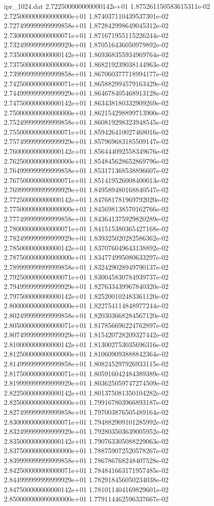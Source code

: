 \begin{filecontents}{ipr_1024.dat}
2.722500000000000142e+01 1.875261150583615311e-02
2.725000000000000000e+01 1.874037110439537301e-02
2.727499999999999858e+01 1.872842998649045312e-02
2.730000000000000071e+01 1.871671955115226244e-02
2.732499999999999929e+01 1.870516436050979892e-02
2.735000000000000142e+01 1.869368355934969764e-02
2.737500000000000000e+01 1.868219239038144963e-02
2.739999999999999858e+01 1.867060377718994177e-02
2.742500000000000071e+01 1.865882994579163429e-02
2.744999999999999929e+01 1.864678405468913128e-02
2.747500000000000142e+01 1.863438180332909269e-02
2.750000000000000000e+01 1.862154298899713900e-02
2.752499999999999858e+01 1.860819298323948545e-02
2.755000000000000071e+01 1.859426410027468016e-02
2.757499999999999929e+01 1.857969683185509147e-02
2.760000000000000142e+01 1.856444092558349676e-02
2.762500000000000000e+01 1.854845628652869796e-02
2.764999999999999858e+01 1.853171368538896607e-02
2.767500000000000071e+01 1.851419526008400013e-02
2.769999999999999929e+01 1.849589480168840547e-02
2.772500000000000142e+01 1.847681781969792020e-02
2.775000000000000000e+01 1.845698138570162766e-02
2.777499999999999858e+01 1.843641375929820289e-02
2.780000000000000071e+01 1.841515380365427168e-02
2.782499999999999929e+01 1.839325020282586362e-02
2.785000000000000142e+01 1.837076049643138892e-02
2.787500000000000000e+01 1.834774995080633297e-02
2.789999999999999858e+01 1.832429028949790137e-02
2.792500000000000071e+01 1.830045830784939737e-02
2.794999999999999929e+01 1.827633439967840320e-02
2.797500000000000142e+01 1.825200102483361120e-02
2.800000000000000000e+01 1.822754114848977244e-02
2.802499999999999858e+01 1.820303668284567120e-02
2.805000000000000071e+01 1.817856696224762897e-02
2.807499999999999929e+01 1.815420728209327442e-02
2.810000000000000142e+01 1.813002753035696316e-02
2.812500000000000000e+01 1.810609093888842364e-02
2.814999999999999858e+01 1.808245297926933115e-02
2.817500000000000071e+01 1.805916042484389389e-02
2.819999999999999929e+01 1.803625059747274509e-02
2.822500000000000142e+01 1.801375081350104282e-02
2.825000000000000000e+01 1.799167803966893187e-02
2.827499999999999858e+01 1.797003876505489164e-02
2.830000000000000071e+01 1.794882909101285992e-02
2.832499999999999929e+01 1.792803503639005952e-02
2.835000000000000142e+01 1.790763305088229063e-02
2.837500000000000000e+01 1.788759072520578267e-02
2.839999999999999858e+01 1.786786768248407528e-02
2.842500000000000071e+01 1.784841663171957485e-02
2.844999999999999929e+01 1.782918456050234038e-02
2.847500000000000142e+01 1.781011404169829601e-02
2.850000000000000000e+01 1.779114462596337667e-02

\end{filecontents}
